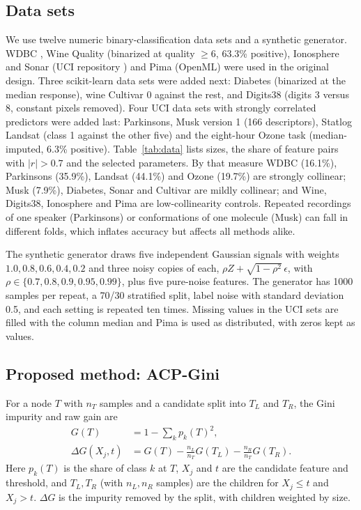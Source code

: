 \documentclass[pdflatex,sn-basic,Numbered]{sn-jnl}
\begin{document}
\subsection{Data sets}
We use twelve numeric binary-classification data sets and a synthetic generator. WDBC \cite{pedregosa2011sklearn}, Wine Quality (binarized at quality $\ge6$, 63.3\% positive), Ionosphere and Sonar (UCI repository \cite{uci2024}) and Pima (OpenML) were used in the original design. Three scikit-learn data sets were added next: Diabetes (binarized at the median response), wine Cultivar 0 against the rest, and Digits38 (digits 3 versus 8, constant pixels removed). Four UCI data sets with strongly correlated predictors \cite{uci2024} were added last: Parkinsons, Musk version 1 (166 descriptors), Statlog Landsat (class 1 against the other five) and the eight-hour Ozone task (median-imputed, 6.3\% positive). Table~\ref{tab:data} lists sizes, the share of feature pairs with $|r|>0.7$ and the selected parameters. By that measure WDBC (16.1\%), Parkinsons (35.9\%), Landsat (44.1\%) and Ozone (19.7\%) are strongly collinear; Musk (7.9\%), Diabetes, Sonar and Cultivar are mildly collinear; and Wine, Digits38, Ionosphere and Pima are low-collinearity controls. Repeated recordings of one speaker (Parkinsons) or conformations of one molecule (Musk) can fall in different folds, which inflates accuracy but affects all methods alike.

The synthetic generator draws five independent Gaussian signals with weights $1.0, 0.8, 0.6, 0.4, 0.2$ and three noisy copies of each, $\rho Z+\sqrt{1-\rho^2}\,\epsilon$, with $\rho\in\{0.7,0.8,0.9,0.95,0.99\}$, plus five pure-noise features. The generator has 1000 samples per repeat, a 70/30 stratified split, label noise with standard deviation 0.5, and each setting is repeated ten times. Missing values in the UCI sets are filled with the column median and Pima is used as distributed, with zeros kept as values.

\begin{table}[!ht]\centering\caption{Data-set statistics and collinearity diagnostics.}\label{tab:data}\scriptsize\end{table}

\subsection{Proposed method: ACP-Gini}
For a node $T$ with $n_T$ samples and a candidate split into $T_L$ and $T_R$, the Gini impurity and raw gain are
\begin{align}
G(T)&=1-\sum_k p_k(T)^2,\\
\Delta G(X_j,t)&=G(T)-\frac{n_L}{n_T}G(T_L)-\frac{n_R}{n_T}G(T_R).
\end{align}
Here $p_k(T)$ is the share of class $k$ at $T$, $X_j$ and $t$ are the candidate feature and threshold, and $T_L,T_R$ (with $n_L,n_R$ samples) are the children for $X_j\le t$ and $X_j>t$. $\Delta G$ is the impurity removed by the split, with children weighted by size.
\end{document}
